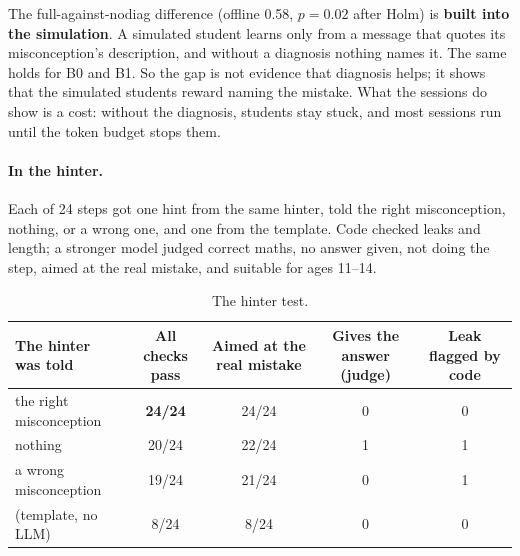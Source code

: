 \documentclass[11pt,a4paper]{article}
\newcommand{\cond}[1]{\textsf{#1}}
\newcommand{\best}[1]{\textbf{#1}}
\begin{document}
The full-against-\cond{nodiag} difference (offline 0.58, $p = 0.02$ after Holm) is \textbf{built into the simulation}. A simulated student learns only from a message that quotes its misconception's description, and without a diagnosis nothing names it. The same holds for B0 and B1. So the gap is not evidence that diagnosis helps; it shows that the simulated students reward naming the mistake. What the sessions do show is a cost: without the diagnosis, students stay stuck, and most sessions run until the token budget stops them.

\paragraph{In the hinter.} Each of 24 steps got one hint from the same hinter, told the right misconception, nothing, or a wrong one, and one from the template. Code checked leaks and length; a stronger model judged correct maths, no answer given, not doing the step, aimed at the real mistake, and suitable for ages 11--14.
\begin{table}[H]
\centering\small
\begin{tabularx}{\linewidth}{@{}P{4.3cm}CCCC@{}}
\toprule
The hinter was told & All checks pass & Aimed at the real mistake & Gives the answer (judge) & Leak flagged by code \\
\midrule
{}the right misconception & \best{24/24} & 24/24 & 0 & 0 \\
nothing & 20/24 & 22/24 & 1 & 1 \\
a wrong misconception & 19/24 & 21/24 & 0 & 1 \\
(template, no LLM) & 8/24 & 8/24 & 0 & 0 \\
\bottomrule
\end{tabularx}
\caption{The hinter test.}
\label{tab:hinter}
\end{table}
\end{document}
